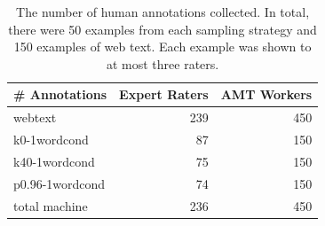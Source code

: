 \begin{table}
\small
\centering
\caption{The number of human annotations collected. In total, there were 50 examples from each sampling strategy and 150 examples of web text. Each example was shown to at most three raters.}
    \begin{tabular}{lrr}
    \hline
    \textbf{\# Annotations} & \textbf{Expert Raters} & \textbf{AMT Workers} \\
    \hline\hline
    webtext & 239   & 450 \\
    \hline
    k0-1wordcond & 87    & 150 \\
    k40-1wordcond & 75    & 150 \\
    p0.96-1wordcond & 74    & 150 \\
    total machine & 236   & 450 \\
    \hline
    \end{tabular}%
  \label{tab:amt_counts}%
\end{table}

